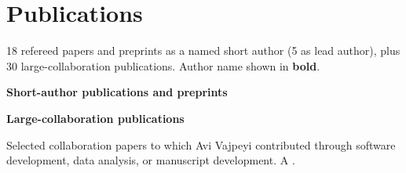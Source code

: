 \nocite{*}

\section{Publications}\label{publications}

\renewcommand*{\bibfont}{\footnotesize}

\small{18 refereed papers and preprints as a named short author (5 as lead
author), plus 30 large-collaboration publications. Author name shown in
\textbf{bold}.}
\vspace{4pt}

\textbf{Short-author publications and preprints}

\printbibliography[heading=none,filter=shortauthor]

\textbf{Large-collaboration publications}

\small{Selected collaboration papers to which Avi Vajpeyi contributed through
software development, data analysis, or manuscript development. A
.}

\printbibliography[heading=none,category=collaboration]
